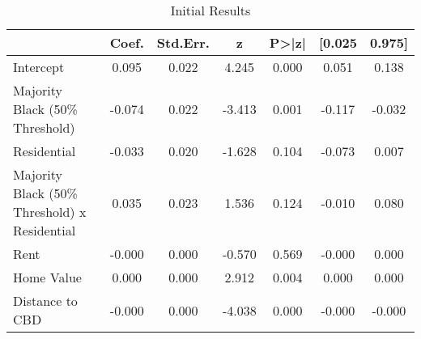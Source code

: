 \begin{table}[h]
\centering
\caption{Initial Results}
\label{tab:initial_results}
\begin{tabular}{lcccccc}
\toprule
 & Coef. & Std.Err. & z & P>|z| & [0.025 & 0.975] \\
\midrule
Intercept & 0.095 & 0.022 & 4.245 & 0.000 & 0.051 & 0.138 \\
Majority Black (50\% Threshold) & -0.074 & 0.022 & -3.413 & 0.001 & -0.117 & -0.032 \\
Residential & -0.033 & 0.020 & -1.628 & 0.104 & -0.073 & 0.007 \\
Majority Black (50\% Threshold) x Residential & 0.035 & 0.023 & 1.536 & 0.124 & -0.010 & 0.080 \\
Rent & -0.000 & 0.000 & -0.570 & 0.569 & -0.000 & 0.000 \\
Home Value & 0.000 & 0.000 & 2.912 & 0.004 & 0.000 & 0.000 \\
Distance to CBD & -0.000 & 0.000 & -4.038 & 0.000 & -0.000 & -0.000 \\
\bottomrule
\end{tabular}
\end{table}
